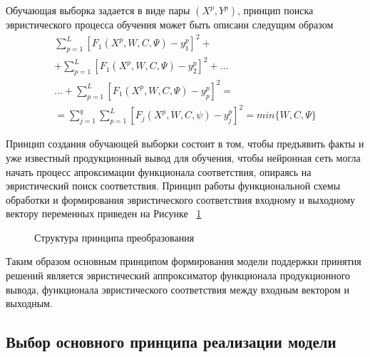 Обучающая выборка задается в виде пары $(X^p, Y^p)$, принцип поиска эвристического процесса обучения может быть описани следущим образом
\begin{equation}
    \label{eq:equation58}
    \begin{alignedat}{2}
        \sum_{p=1}^L[F_1(X^p,W,C,\Psi) - y_1^p]^2 + \\
        + \sum_{p=1}^L[F_1(X^p,W,C,\Psi) - y_2^p]^2 +  ... \\
       ... +  \sum_{p=1}^L[F_1(X^p,W,C,\Psi) - y_p^p]^2 = \\
        = \sum_{j = 1}^q{\sum_{p=1}^L{[F_j(X^p,W,C,\psi) - y^p_j]^2}}
        = min\{W,C,\Psi\}
    \end{alignedat}
\end{equation}

Принцип создания обучающей выборки состоит в том, чтобы предъявить факты и уже известный продукционный вывод для обучения, чтобы нейронная сеть могла начать процесс апроксимации функционала соответствия, опираясь на эвристический поиск соответствия.
Принцип работы функциональной схемы обработки и формирования эвристического соответствия входному и выходному вектору переменных приведен на Рисунке ~\cref{fig:FL}
\begin{figure}[ht]
    \caption{Структура принципа преобразования}\label{fig:FL}
\end{figure}

Таким образом основным принципом формирования модели поддержки принятия решений является эвристический аппроксиматор функционала продукционного вывода, функционала эвристического соответствия между входным вектором и выходным.

\subsection{Выбор основного принципа реализации модели}\label{subsec:ch3/sect2/sub1}

